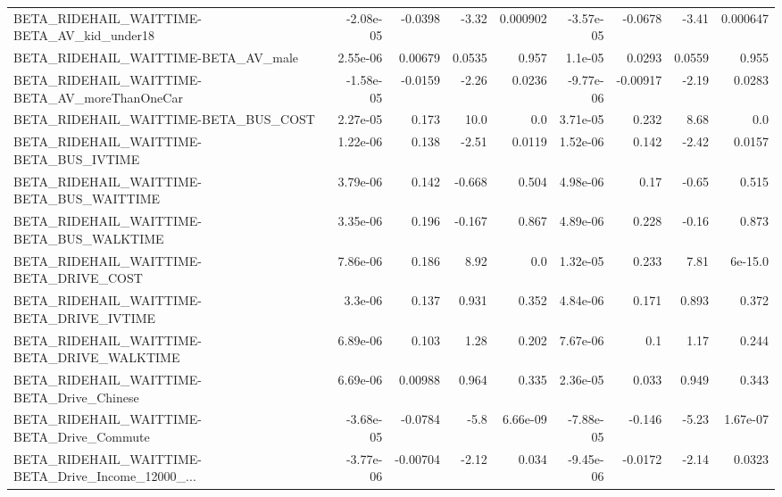 \begin{tabular}{lrrrrrrrr}
BETA\_RIDEHAIL\_WAITTIME-BETA\_AV\_kid\_under18         &   -2.08e-05 &      -0.0398 &     -3.32 & 0.000902 &  -3.57e-05 &     -0.0678 &        -3.41 &      0.000647 \\
BETA\_RIDEHAIL\_WAITTIME-BETA\_AV\_male                &    2.55e-06 &      0.00679 &    0.0535 &    0.957 &    1.1e-05 &      0.0293 &       0.0559 &         0.955 \\
BETA\_RIDEHAIL\_WAITTIME-BETA\_AV\_moreThanOneCar      &   -1.58e-05 &      -0.0159 &     -2.26 &   0.0236 &  -9.77e-06 &    -0.00917 &        -2.19 &        0.0283 \\
BETA\_RIDEHAIL\_WAITTIME-BETA\_BUS\_COST               &    2.27e-05 &        0.173 &      10.0 &      0.0 &   3.71e-05 &       0.232 &         8.68 &           0.0 \\
BETA\_RIDEHAIL\_WAITTIME-BETA\_BUS\_IVTIME             &    1.22e-06 &        0.138 &     -2.51 &   0.0119 &   1.52e-06 &       0.142 &        -2.42 &        0.0157 \\
BETA\_RIDEHAIL\_WAITTIME-BETA\_BUS\_WAITTIME           &    3.79e-06 &        0.142 &    -0.668 &    0.504 &   4.98e-06 &        0.17 &        -0.65 &         0.515 \\
BETA\_RIDEHAIL\_WAITTIME-BETA\_BUS\_WALKTIME           &    3.35e-06 &        0.196 &    -0.167 &    0.867 &   4.89e-06 &       0.228 &        -0.16 &         0.873 \\
BETA\_RIDEHAIL\_WAITTIME-BETA\_DRIVE\_COST             &    7.86e-06 &        0.186 &      8.92 &      0.0 &   1.32e-05 &       0.233 &         7.81 &       6e-15.0 \\
BETA\_RIDEHAIL\_WAITTIME-BETA\_DRIVE\_IVTIME           &     3.3e-06 &        0.137 &     0.931 &    0.352 &   4.84e-06 &       0.171 &        0.893 &         0.372 \\
BETA\_RIDEHAIL\_WAITTIME-BETA\_DRIVE\_WALKTIME         &    6.89e-06 &        0.103 &      1.28 &    0.202 &   7.67e-06 &         0.1 &         1.17 &         0.244 \\
BETA\_RIDEHAIL\_WAITTIME-BETA\_Drive\_Chinese          &    6.69e-06 &      0.00988 &     0.964 &    0.335 &   2.36e-05 &       0.033 &        0.949 &         0.343 \\
BETA\_RIDEHAIL\_WAITTIME-BETA\_Drive\_Commute          &   -3.68e-05 &      -0.0784 &      -5.8 & 6.66e-09 &  -7.88e-05 &      -0.146 &        -5.23 &      1.67e-07 \\
BETA\_RIDEHAIL\_WAITTIME-BETA\_Drive\_Income\_12000\_... &   -3.77e-06 &     -0.00704 &     -2.12 &    0.034 &  -9.45e-06 &     -0.0172 &        -2.14 &        0.0323 \\

\end{tabular}
